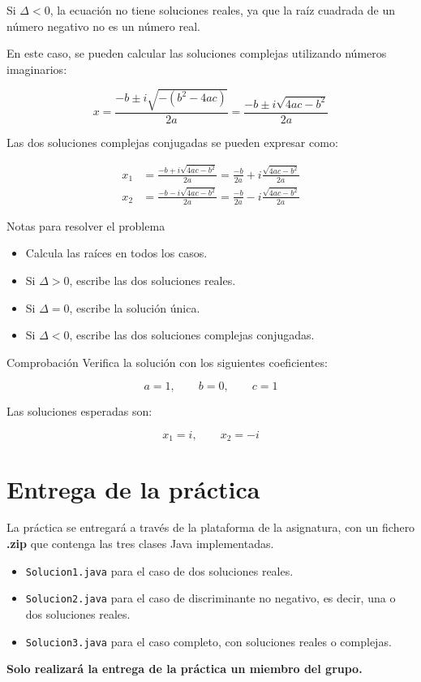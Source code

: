 \documentclass[
  spanish,
  11pt,
  a4paper,
  DIV=11,
  numbers=noendperiod]{scrartcl}
\providecommand{\tightlist}{\setlength{\itemsep}{0pt}\setlength{\parskip}{0pt}}
\begin{document}
Si \(\Delta < 0\), la ecuación no tiene soluciones reales, ya que la raíz cuadrada de un número negativo no es un número real.

En este caso, se pueden calcular las soluciones complejas utilizando números imaginarios:

\[
x = \frac{-b \pm i\sqrt{-(b^2 - 4ac)}}{2a} = \frac{-b \pm i\sqrt{4ac - b^2}}{2a}
\]

Las dos soluciones complejas conjugadas se pueden expresar como:

\[
\begin{aligned}
x_1 &= \frac{-b + i\sqrt{4ac - b^2}}{2a} = \frac{-b}{2a} + i\frac{\sqrt{4ac - b^2}}{2a} \\
x_2 &= \frac{-b - i\sqrt{4ac - b^2}}{2a} = \frac{-b}{2a} - i\frac{\sqrt{4ac - b^2}}{2a}
\end{aligned}
\]

\begin{PracticeNoteBox}{Notas para resolver el problema}
\begin{itemize}
\tightlist
\item Calcula las raíces en todos los casos.
\item Si \(\Delta > 0\), escribe las dos soluciones reales.
\item Si \(\Delta = 0\), escribe la solución única.
\item Si \(\Delta < 0\), escribe las dos soluciones complejas conjugadas.
\end{itemize}
\end{PracticeNoteBox}


\begin{PracticeTipBox}{Comprobación}
Verifica la solución con los siguientes coeficientes:

\[
a=1,\qquad b=0,\qquad c=1
\]

Las soluciones esperadas son:

\[
x_1 = i,\qquad x_2 = -i
\]
\end{PracticeTipBox}

\section{Entrega de la práctica}\label{entrega-de-la-practica}

La práctica se entregará a través de la plataforma de la asignatura, con un fichero \textbf{.zip} que contenga las tres clases Java implementadas.

\begin{itemize}
\tightlist
\item \texttt{Solucion1.java} para el caso de dos soluciones reales.
\item \texttt{Solucion2.java} para el caso de discriminante no negativo, es decir, una o dos soluciones reales.
\item \texttt{Solucion3.java} para el caso completo, con soluciones reales o complejas.
\end{itemize}

\textbf{Solo realizará la entrega de la práctica un miembro del grupo.}
\end{document}
